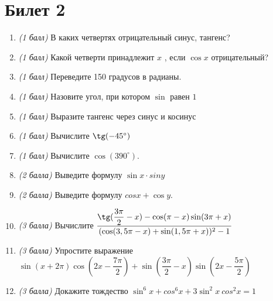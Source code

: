 \documentclass[12pt, a4paper]{article}
\begin{document}
	\section*{Билет 2}
	\begin{enumerate}
		\item \textit{(1 балл)}	В каких четвертях отрицательный синус, тангенс? 
		\item \textit{(1 балл)}	Какой четверти принадлежит $x$ , если $\cos x$ отрицательный?
		\item \textit{(1 балл)}	Переведите 150 градусов в радианы.
		\item \textit{(1 балл)}	Назовите угол, при котором $\sin$  равен $1$
		\item \textit{(1 балл)} Выразите тангенс через синус и косинус
		\item \textit{(1 балл)} Вычислите $\tg (-45^{\circ})$
		\item \textit{(1 балл)}	Вычислите $\cos (390^{\circ})$.
		\item \textit{(2 балла)} Выведите формулу $\sin x \cdot sin y$ 
		\item \textit{(2 балла)} Выведите формулу $cos x + \cos y$.
		\item \textit{(3 балла)} Вычислите $\dfrac{\tg(\dfrac{3\pi}{2}-x)-\cos (\pi-x) \sin (3\pi + x)}{(\cos (3,5\pi - x) + \sin (1,5\pi + x))^2-1}$
		\item \textit{(3 балла)} Упростите выражение $\sin(x+2\pi) \cos (2x-\dfrac{7\pi}{2}) + \sin (\dfrac{3\pi}{2}-x) \sin (2x-\dfrac{5\pi}{2})$
		\item \textit{(3 балла)} Докажите тождество $\sin^6x + cos^6x + 3\sin^2x \ cos^2x = 1$
	\end{enumerate}

\newpage 
\end{document}
